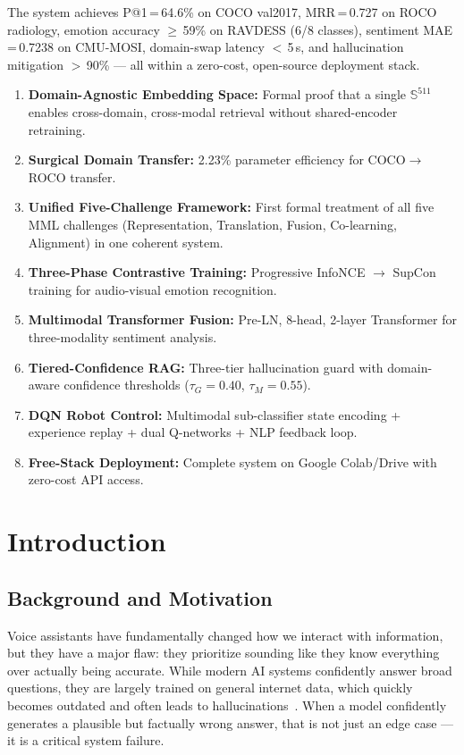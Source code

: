 \documentclass[12pt,a4paper]{article}
\theoremstyle{definition}
\theoremstyle{plain}
\theoremstyle{remark}
\newcommand{\Sph}{\mathbb{S}}
\begin{document}
The system achieves P@1\,=\,64.6\% on COCO val2017, MRR\,=\,0.727 on ROCO radiology, emotion accuracy $\geq$\,59\% on RAVDESS (6/8 classes), sentiment MAE\,=\,0.7238 on CMU-MOSI, domain-swap latency $<$\,5\,s, and hallucination mitigation $>$\,90\% --- all within a zero-cost, open-source deployment stack.

\begin{tcolorbox}[keybox,title={Summary of Contributions}]
\begin{enumerate}[label=\textbf{C\arabic*.}]
  \item \textbf{Domain-Agnostic Embedding Space:} Formal proof that a single $\Sph^{511}$ enables cross-domain, cross-modal retrieval without shared-encoder retraining.
  \item \textbf{Surgical Domain Transfer:} 2.23\% parameter efficiency for COCO$\to$ROCO transfer.
  \item \textbf{Unified Five-Challenge Framework:} First formal treatment of all five MML challenges (Representation, Translation, Fusion, Co-learning, Alignment) in one coherent system.
  \item \textbf{Three-Phase Contrastive Training:} Progressive InfoNCE $\to$ SupCon training for audio-visual emotion recognition.
  \item \textbf{Multimodal Transformer Fusion:} Pre-LN, 8-head, 2-layer Transformer for three-modality sentiment analysis.
  \item \textbf{Tiered-Confidence RAG:} Three-tier hallucination guard with domain-aware confidence thresholds ($\tau_G=0.40$, $\tau_M=0.55$).
  \item \textbf{DQN Robot Control:} Multimodal sub-classifier state encoding + experience replay + dual Q-networks + NLP feedback loop.
  \item \textbf{Free-Stack Deployment:} Complete system on Google Colab/Drive with zero-cost API access.
\end{enumerate}
\end{tcolorbox}

\section{Introduction}

\subsection{Background and Motivation}

Voice assistants have fundamentally changed how we interact with information, but they have a major flaw: they prioritize sounding like they know everything over actually being accurate. While modern AI systems confidently answer broad questions, they are largely trained on general internet data, which quickly becomes outdated and often leads to hallucinations~\cite{lewis2020rag}. When a model confidently generates a plausible but factually wrong answer, that is not just an edge case --- it is a critical system failure.
\end{document}
